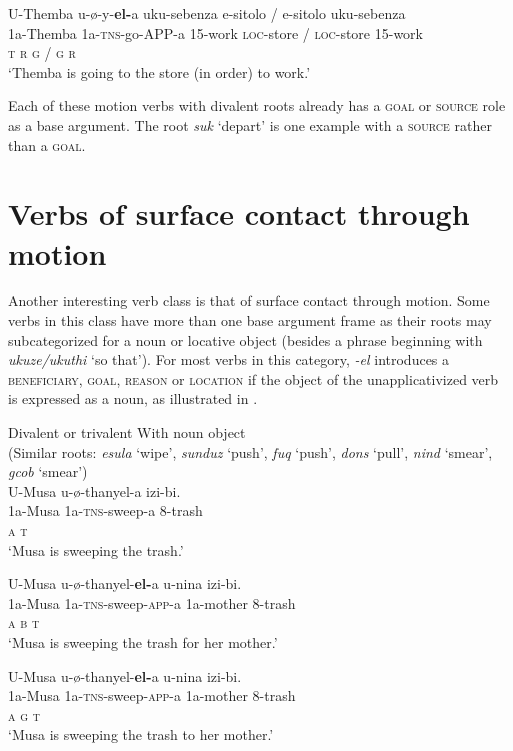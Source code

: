\documentclass[output=paper]{langsci/langscibook}
\begin{document}
\ex
\gll U-Themba u-ø-y-\textbf{el-}a uku-sebenza e-sitolo / e-sitolo uku-sebenza \\
 1a-Themba 1a-\textsc{tns}-go-APP-a 15-work \textsc{loc}-store / \textsc{loc}-store 15-work\\
 \textsc{t r g / g r}\\
\glt ‘Themba is going to the store (in order) to work.’
\z
\z


Each of these motion verbs with divalent roots already has a \textsc{goal} or \textsc{source} role as a base argument. The root \textit{suk} ‘depart’ is one example with a \textsc{source} rather than a \textsc{goal}.

\section{Verbs of surface contact through motion}

Another interesting verb class is that of surface contact through motion. Some verbs in this class have more than one base argument frame as their roots may subcategorized for a noun or locative object (besides a phrase beginning with \textit{ukuze/ukuthi} ‘so that’). For most verbs in this category, \textit{-el} introduces a \textsc{beneficiary}, \textsc{goal}, \textsc{reason} or \textsc{location} if the object of the unapplicativized verb is expressed as a noun, as illustrated in . 

\ea
{Divalent or trivalent With noun object}\\
 (Similar roots: \textit{esula} ‘wipe’, \textit{sunduz} ‘push’, \textit{fuq} ‘push’, \textit{dons} ‘pull’, \textit{nind} ‘smear’, \textit{gcob} ‘smear’)\\
\ea
\gll U-Musa u-ø-thanyel-a izi-bi. \\
 1a-Musa 1a-\textsc{tns}-sweep-a 8-trash\\
 \textsc{a t}\\
\glt ‘Musa is sweeping the trash.’

\ex
\gll U-Musa u-ø-thanyel-\textbf{el-}a u-nina izi-bi. \\
 1a-Musa 1a-\textsc{tns}-sweep-\textsc{app}-a 1a-mother 8-trash\\
 \textsc{a b t}\\
\glt ‘Musa is sweeping the trash for her mother.’

\ex
\gll U-Musa u-ø-thanyel-\textbf{el-}a u-nina izi-bi. \\
 1a-Musa 1a-\textsc{tns}-sweep-\textsc{app}-a 1a-mother 8-trash\\
 \textsc{a g t}\\
\glt ‘Musa is sweeping the trash to her mother.’
\end{document}
